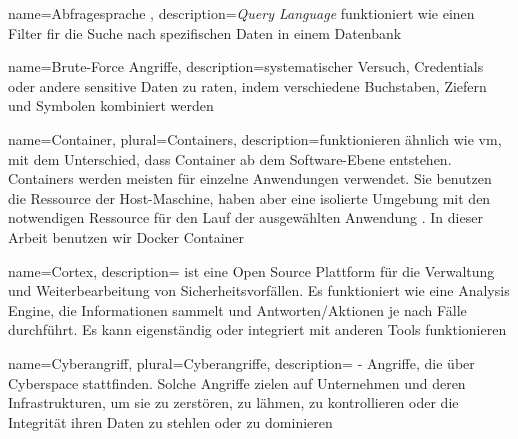  {
    name={Abfragesprache },
    description={\textit{Query Language} funktioniert wie einen Filter fir die Suche nach spezifischen Daten in einem Datenbank \citep{at_query}}}




 {
    name={Brute-Force Angriffe},
    description={systematischer Versuch, Credentials oder andere sensitive Daten zu raten, indem verschiedene Buchstaben, Ziefern und Symbolen kombiniert werden \citep{Sowmya_BruteForce}}}


 {
    name={Container},
    plural={Containers},
    description={funktionieren ähnlich wie vm, mit dem Unterschied, dass Container ab dem Software-Ebene entstehen. Containers werden meisten für einzelne Anwendungen verwendet. Sie benutzen die Ressource der Host-Maschine, haben aber eine isolierte Umgebung mit den notwendigen Ressource für den Lauf der ausgewählten Anwendung \citep{Douglis_Container}. In dieser Arbeit benutzen wir Docker Container}}

 {
    name={Cortex},
    description={ ist eine  Open Source Plattform für die Verwaltung und Weiterbearbeitung von Sicherheitsvorfällen. Es funktioniert wie eine Analysis Engine, die Informationen sammelt und Antworten/Aktionen je nach Fälle durchführt. Es kann eigenständig oder integriert mit anderen Tools  funktionieren \citep{TheHive}}   
}


 {
    name={Cyberangriff},
    plural={Cyberangriffe},
    description={ - Angriffe, die über Cyberspace stattfinden. Solche Angriffe zielen auf Unternehmen und deren Infrastrukturen, um sie zu zerstören, zu lähmen, zu kontrollieren oder die Integrität ihren Daten zu stehlen oder zu dominieren \citep{NIST_Definitions}}}

